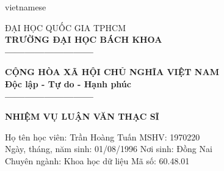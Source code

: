 \begin{titlepage}
\begin{otherlanguage*}{vietnamese}

    \begin{minipage}[t]{0.42\textwidth}
        \begin{center}
            \fontsize{11.5}{11.5}ĐẠI HỌC QUỐC GIA TPHCM\\
            \textbf{TRƯỜNG ĐẠI HỌC BÁCH KHOA}\\
            \textbf{---------------------------}\\
        \end{center}
    \end{minipage}
    \noindent
    \begin{minipage}[t]{0.57\textwidth}
        \begin{center}
            \fontsize{11.5}{11.5}\textbf{CỘNG HÒA XÃ HỘI CHỦ NGHĨA VIỆT NAM}\\
            \textbf{Độc lập - Tự do - Hạnh phúc}\\
            \textbf{---------------------------}\\
        \end{center}
    \end{minipage}

    \begin{center}
        \fontsize{18}{18}\textbf{NHIỆM VỤ LUẬN VĂN THẠC SĨ}
    \end{center}

    \begin{flushleft}
        Họ tên học viên: Trần Hoàng Tuấn
        \tabto{10cm}
        MSHV: 1970220\\
        Ngày, tháng, năm sinh: 01/08/1996
        \tabto{10cm}
        Nơi sinh: Đồng Nai\\
        Chuyên ngành: Khoa học dữ liệu
        \tabto{10cm}
        Mã số: 60.48.01\\


\end{flushleft}
\end{otherlanguage*}
\end{titlepage}
